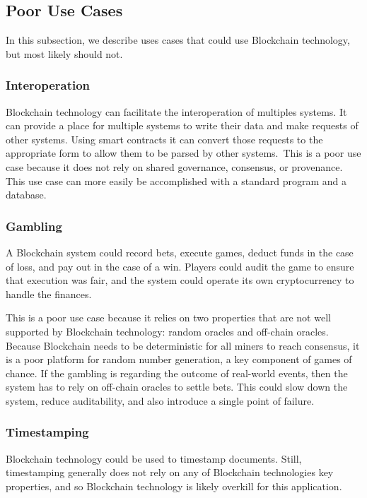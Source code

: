 \subsection{Poor Use Cases}
In this subsection, we describe uses cases that could use Blockchain technology, but most likely should not.

\subsubsection{Interoperation}
Blockchain technology can facilitate the interoperation of multiples systems.
It can provide a place for multiple systems to write their data and make requests of other systems.
Using smart contracts it can convert those requests to the appropriate form to allow them to be parsed by other systems.\
This is a poor use case because it does not rely on shared governance, consensus, or provenance.
This use case can more easily be accomplished with a standard program and a database.

\subsubsection{Gambling}
A Blockchain system could record bets, execute games, deduct funds in the case of loss, and pay out in the case of a win.
Players could audit the game to ensure that execution was fair, and the system could operate its own cryptocurrency to handle the finances.

This is a poor use case because it relies on two properties that are not well supported by Blockchain technology: random oracles and off-chain oracles.
Because Blockchain needs to be deterministic for all miners to reach consensus, it is a poor platform for random number generation, a key component of games of chance.
If the gambling is regarding the outcome of real-world events, then the system has to rely on off-chain oracles to settle bets. This could slow down the system, reduce auditability, and also introduce a single point of failure.

\subsubsection{Timestamping}
Blockchain technology could be used to timestamp documents. Still, timestamping generally does not rely on any of Blockchain technologies key properties, and so Blockchain technology is likely overkill for this application.